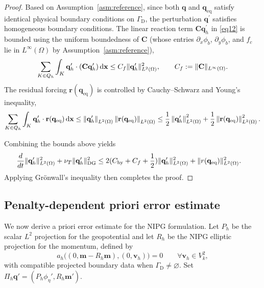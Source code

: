 \documentclass[pdflatex,sn-mathphys-num]{sn-jnl}%
\theoremstyle{thmstyleone}%
\theoremstyle{thmstyletwo}%
\theoremstyle{thmstylethree}%
\begin{document}
\begin{proof}
Based on Assumption~\ref{asm:reference}, since both $\mathbf{q}$ and $\mathbf{q}_{\mathrm{eq}}$ satisfy identical physical boundary conditions on $\Gamma_{\mathrm{D}}$, the perturbation $\mathbf{q}^\prime$ satisfies homogeneous boundary conditions. The linear reaction term $\mathbf{C}\mathbf{q}_h^\prime$ in \eqref{eq12} is bounded using the uniform boundedness of $\mathbf{C}$ (whose entries $\partial_x\phi_b$, $\partial_y\phi_b$, and $f_c$ lie in $L^\infty(\Omega)$ by Assumption~\ref{asm:reference}),
\begin{equation}\notag
\sum_{K \in Q_h}\int_{K} \mathbf{q}_h^{\prime}\cdot(\mathbf{C}\mathbf{q}_h^\prime)\,\mathrm{d}\mathbf{x} \le C_f \|\mathbf{q}_h^\prime\|_{L^2(\Omega)}^2, \qquad C_f := \|\mathbf{C}\|_{L^\infty(\Omega)}.
\end{equation}
The residual forcing $\mathbf{r}(\mathbf{q}_{\mathrm{eq}})$ is controlled by Cauchy--Schwarz and Young's inequality,
\begin{equation}\notag
\sum_{K \in Q_h}\int_{K} \mathbf{q}_h^{\prime}  \cdot \mathbf{r}(\mathbf{q}_{\mathrm{eq}}) \,\mathrm{d} \mathbf{x} \leq \left\|\mathbf{q}_h^{\prime}\right\|_{L^2(\Omega)}\left\|\mathbf{r}(\mathbf{q}_{\mathrm{eq}})\right\|_{L^2(\Omega)} \leq \frac{1}{2} \left\|\mathbf{q}_h^{\prime}\right\|_{L^2(\Omega)}^2+\frac{1}{2}\left\|\mathbf{r}(\mathbf{q}_{\mathrm{eq}})\right\|_{L^2(\Omega)}^2.
\end{equation}

Combining the bounds above yields
\begin{equation}\notag
\begin{aligned} 
\frac{d}{dt}\|\mathbf{q}_h^{\prime}\|_{L^2(\Omega)}^2
+
\nu_T\|\mathbf{q}_h^{\prime}\|_{\mathrm{DG}}^2 &\le
2(C_{\mathrm{hy}}+C_f + \frac{1}{2})\|\mathbf{q}^{\prime}_h\|_{L^2(\Omega)}^2
+\|r(\mathbf{q}_{\mathrm{eq}})\|_{L^2(\Omega)}^2.
\end{aligned}
\end{equation}
Applying Grönwall’s inequality then completes the proof.
\end{proof}

\subsection{Penalty-dependent priori error estimate}
We now derive a priori error estimate for the NIPG formulation.
Let $P_h$ be the scalar $L^2$ projection for the geopotential and let $R_h$ be the NIPG elliptic projection for the momentum, defined by
\[
a_h\bigl((0,\mathbf m-R_h\mathbf m),(0,\mathbf v_h)\bigr)=0
\qquad\forall\mathbf v_h\in V_k^2,
\]
with compatible projected boundary data when $\Gamma_{\mathrm D}\ne\varnothing$. Set $\Pi_h\mathbf q'=(P_h\phi_\eta',R_h\mathbf m')$.
\end{document}

